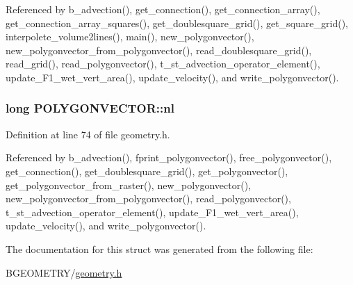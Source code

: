 Referenced by b\-\_\-advection(), get\-\_\-connection(), get\-\_\-connection\-\_\-array(), get\-\_\-connection\-\_\-array\-\_\-squares(), get\-\_\-doublesquare\-\_\-grid(), get\-\_\-square\-\_\-grid(), interpolete\-\_\-volume2lines(), main(), new\-\_\-polygonvector(), new\-\_\-polygonvector\-\_\-from\-\_\-polygonvector(), read\-\_\-doublesquare\-\_\-grid(), read\-\_\-grid(), read\-\_\-polygonvector(), t\-\_\-st\-\_\-advection\-\_\-operator\-\_\-element(), update\-\_\-\-F1\-\_\-wet\-\_\-vert\-\_\-area(), update\-\_\-velocity(), and write\-\_\-polygonvector().

\hypertarget{struct_p_o_l_y_g_o_n_v_e_c_t_o_r_a95c31cf4ec12ed9f55ea0a6f38794bb6}{
\subsubsection[{nl}]{\setlength{\rightskip}{0pt plus 5cm}long P\-O\-L\-Y\-G\-O\-N\-V\-E\-C\-T\-O\-R\-::nl}}\label{struct_p_o_l_y_g_o_n_v_e_c_t_o_r_a95c31cf4ec12ed9f55ea0a6f38794bb6}


Definition at line 74 of file geometry.\-h.



Referenced by b\-\_\-advection(), fprint\-\_\-polygonvector(), free\-\_\-polygonvector(), get\-\_\-connection(), get\-\_\-doublesquare\-\_\-grid(), get\-\_\-polygonvector(), get\-\_\-polygonvector\-\_\-from\-\_\-raster(), new\-\_\-polygonvector(), new\-\_\-polygonvector\-\_\-from\-\_\-polygonvector(), read\-\_\-polygonvector(), t\-\_\-st\-\_\-advection\-\_\-operator\-\_\-element(), update\-\_\-\-F1\-\_\-wet\-\_\-vert\-\_\-area(), update\-\_\-velocity(), and write\-\_\-polygonvector().



The documentation for this struct was generated from the following file\-:\begin{DoxyCompactItemize}
\item 
B\-G\-E\-O\-M\-E\-T\-R\-Y/\hyperlink{geometry_8h}{geometry.\-h}\end{DoxyCompactItemize}
